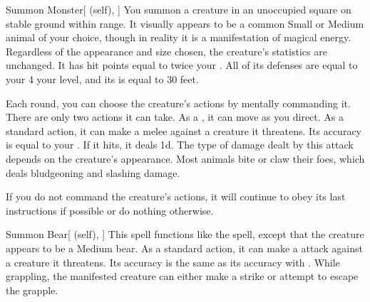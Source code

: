 \lowercase{\hypertarget{spell:Summon Monster}{}}\label{spell:Summon Monster}
\begin{attuneability}[\nth{1}]{\hypertarget{spell:Summon Monster}{Summon Monster}}[ (self), ]
You summon a creature in an unoccupied square on stable ground within \rngmed range.
It visually appears to be a common Small or Medium animal of your choice, though in reality it is a manifestation of magical energy.
Regardless of the appearance and size chosen, the creature's statistics are unchanged.
It has hit points equal to twice your .
All of its defenses are equal to your 4 \add your level, and its  is equal to 30 feet.

Each round, you can choose the creature's actions by mentally commanding it.
There are only two actions it can take.
As a , it can move as you direct.
As a standard action, it can make a melee  against a creature it threatens.
Its accuracy is equal to your .
If it hits, it deals  \minus1d.
The type of damage dealt by this attack depends on the creature's appearance.
Most animals bite or claw their foes, which deals bludgeoning and slashing damage.

If you do not command the creature's actions, it will continue to obey its last instructions if possible or do nothing otherwise.
\end{attuneability}
\vspace{0.25em}



\lowercase{\hypertarget{spell:Summon Bear}{}}\label{spell:Summon Bear}
\begin{attuneability}[\nth{2}]{\hypertarget{spell:Summon Bear}{Summon Bear}}[ (self), ]
This spell functions like the  spell, except that the creature appears to be a Medium bear.
As a standard action, it can make a  attack against a creature it threatens.
Its accuracy is the same as its accuracy with .
While grappling, the manifested creature can either make a strike or attempt to escape the grapple.
\end{attuneability}
\vspace{0.25em}




